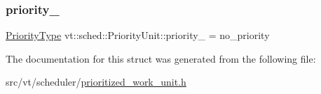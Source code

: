\subsubsection{\texorpdfstring{priority\+\_\+}{priority\_}}
{\footnotesize\ttfamily \hyperlink{namespacevt_a86bff9f556eb761b27fc8600d006ac04}{Priority\+Type} vt\+::sched\+::\+Priority\+Unit\+::priority\+\_\+ = no\+\_\+priority\hspace{0.3cm}{\ttfamily [private]}}



The documentation for this struct was generated from the following file\+:\begin{DoxyCompactItemize}
\item 
src/vt/scheduler/\hyperlink{prioritized__work__unit_8h}{prioritized\+\_\+work\+\_\+unit.\+h}\end{DoxyCompactItemize}
